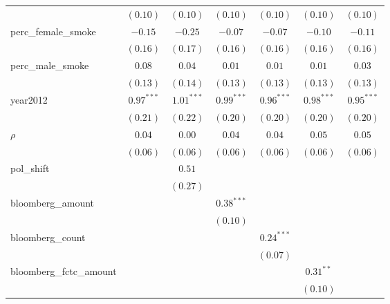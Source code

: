\begin{table}[!h]
\begin{center}
\begin{tabular}{l c c c c c c }
                        & $(0.10)$      & $(0.10)$     & $(0.10)$     & $(0.10)$     & $(0.10)$     & $(0.10)$     \\
perc\_female\_smoke     & $-0.15$       & $-0.25$      & $-0.07$      & $-0.07$      & $-0.10$      & $-0.11$      \\
                        & $(0.16)$      & $(0.17)$     & $(0.16)$     & $(0.16)$     & $(0.16)$     & $(0.16)$     \\
perc\_male\_smoke       & $0.08$        & $0.04$       & $0.01$       & $0.01$       & $0.01$       & $0.03$       \\
                        & $(0.13)$      & $(0.14)$     & $(0.13)$     & $(0.13)$     & $(0.13)$     & $(0.13)$     \\
year2012                & $0.97^{***}$  & $1.01^{***}$ & $0.99^{***}$ & $0.96^{***}$ & $0.98^{***}$ & $0.95^{***}$ \\
                        & $(0.21)$      & $(0.22)$     & $(0.20)$     & $(0.20)$     & $(0.20)$     & $(0.20)$     \\
$\rho$                  & $0.04$        & $0.00$       & $0.04$       & $0.04$       & $0.05$       & $0.05$       \\
                        & $(0.06)$      & $(0.06)$     & $(0.06)$     & $(0.06)$     & $(0.06)$     & $(0.06)$     \\
pol\_shift              &               & $0.51$       &              &              &              &              \\
                        &               & $(0.27)$     &              &              &              &              \\
bloomberg\_amount       &               &              & $0.38^{***}$ &              &              &              \\
                        &               &              & $(0.10)$     &              &              &              \\
bloomberg\_count        &               &              &              & $0.24^{***}$ &              &              \\
                        &               &              &              & $(0.07)$     &              &              \\
bloomberg\_fctc\_amount &               &              &              &              & $0.31^{**}$  &              \\
                        &               &              &              &              & $(0.10)$     &              \\

\end{tabular}
\end{center}
\end{table}
